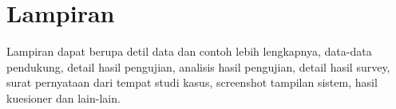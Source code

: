\newpage




\section*{Lampiran}

\noindent Lampiran dapat berupa detil data dan contoh lebih lengkapnya, data-data pendukung, detail hasil pengujian, analisis hasil pengujian, detail hasil survey, surat pernyataan dari tempat studi kasus, screenshot tampilan sistem, hasil kuesioner dan lain-lain.